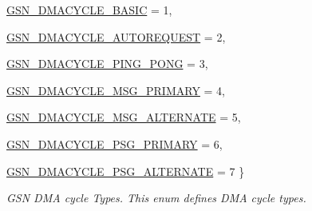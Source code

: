 \begin{DoxyCompactItemize}
\par
\hyperlink{a00645_gga05b9b2e87ca35c2d0564ceca307d349ca21df7e7c776bc4d180db56aa034cebc5}{GSN\_\-DMACYCLE\_\-BASIC} =  1, 
\par
\hyperlink{a00645_gga05b9b2e87ca35c2d0564ceca307d349ca2fe044a6cdf6ea525f1f151576023352}{GSN\_\-DMACYCLE\_\-AUTOREQUEST} =  2, 
\par
\hyperlink{a00645_gga05b9b2e87ca35c2d0564ceca307d349cab734d1a5b321ede92d3e1ada87c12348}{GSN\_\-DMACYCLE\_\-PING\_\-PONG} =  3, 
\par
\hyperlink{a00645_gga05b9b2e87ca35c2d0564ceca307d349caf430059a345ba3a661d4b005e77563bb}{GSN\_\-DMACYCLE\_\-MSG\_\-PRIMARY} =  4, 
\par
\hyperlink{a00645_gga05b9b2e87ca35c2d0564ceca307d349caf5103d4e5d0db5ee3a988ef2225d7208}{GSN\_\-DMACYCLE\_\-MSG\_\-ALTERNATE} =  5, 
\par
\hyperlink{a00645_gga05b9b2e87ca35c2d0564ceca307d349ca67efd25800552979993c637030a04f3c}{GSN\_\-DMACYCLE\_\-PSG\_\-PRIMARY} =  6, 
\par
\hyperlink{a00645_gga05b9b2e87ca35c2d0564ceca307d349ca0f46e759cd5e60ea89a85e50352ec8c6}{GSN\_\-DMACYCLE\_\-PSG\_\-ALTERNATE} =  7
 \}
\begin{DoxyCompactList}\small\item\em GSN DMA cycle Types. This enum defines DMA cycle types. \end{DoxyCompactList}\end{DoxyCompactItemize}
